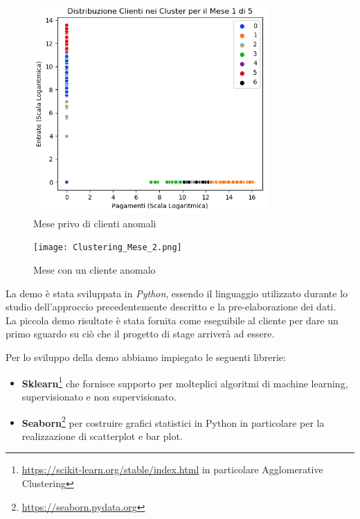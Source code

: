 \begin{figure}[H]
    \includegraphics[width=0.8\textwidth]{Clustering_Mese_1.png}
    \centering
    \caption{Mese privo di clienti anomali}
    \label{fig:mese1}
\end{figure}
\begin{figure}[H]
    \texttt{[image: Clustering\_Mese\_2.png]}
    \centering
    \caption{Mese con un cliente anomalo}
\end{figure}


La demo è stata sviluppata in \textit{Python}, essendo il linguaggio utilizzato durante lo studio dell'approccio precedentemente descritto e la pre-elaborazione dei dati. \\ La piccola demo risultate è stata fornita come eseguibile al cliente per dare un primo sguardo su ciò che il progetto di stage arriverà ad essere. 


Per lo sviluppo della demo abbiamo impiegato le seguenti librerie:
\begin{itemize}
\item \textbf{Sklearn}\footnote{\url{https://scikit-learn.org/stable/index.html} in particolare Agglomerative Clustering } che fornisce supporto per molteplici algoritmi di machine learning, supervisionato e non supervisionato. 
\item \textbf{Seaborn}\footnote{\url{https://seaborn.pydata.org}}  per costruire grafici statistici in Python in particolare per la realizzazione di scatterplot e bar plot.
\end{itemize}


